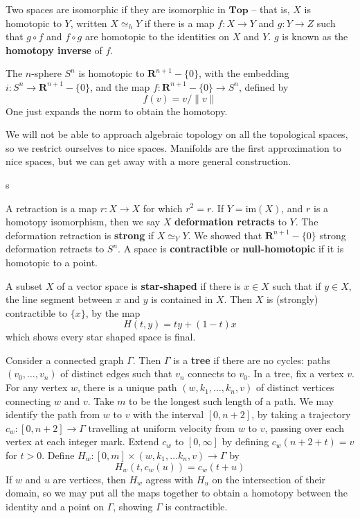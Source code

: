Two spaces are isomorphic if they are isomorphic in $\textbf{Top}$ -- that is, $X$ is homotopic to $Y$, written $X \simeq_h Y$ if there is a map $f:X \to Y$ and $g: Y \to Z$ such that $g \circ f$ and $f \circ g$ are homotopic to the identities on $X$ and $Y$. $g$ is known as the {\bf homotopy inverse} of $f$.

\begin{example}
    The $n$-sphere $S^n$ is homotopic to $\mathbf{R}^{n+1} - \{ 0 \}$, with the embedding $i: S^n \to \mathbf{R}^{n+1} - \{ 0 \}$, and the map $f: \mathbf{R}^{n+1} - \{ 0 \} \to S^n$, defined by
    \[ f(v) = v/\|v\| \]
    One just expands the norm to obtain the homotopy.
\end{example}

We will not be able to approach algebraic topology on all the topological spaces, so we restrict ourselves to nice spaces. Manifolds are the first approximation to nice spaces, but we can get away with a more general construction.

\begin{definition}
    s
\end{definition}

A retraction is a map $r:X \to X$ for which $r^2 = r$. If $Y = \text{im}(X)$, and $r$ is a homotopy isomorphism, then we say $X$ {\bf deformation retracts} to $Y$. The deformation retraction is {\bf strong} if $X \simeq_Y Y$. We showed that $\mathbf{R}^{n+1} - \{ 0 \}$ strong deformation retracts to $S^n$. A space is {\bf contractible} or {\bf null-homotopic} if it is homotopic to a point.

\begin{example}
    A subset $X$ of a vector space is {\bf star-shaped} if there is $x \in X$ such that if $y \in X$, the line segment between $x$ and $y$ is contained in $X$. Then $X$ is (strongly) contractible to $\{ x \}$, by the map
    \[ H(t,y) = ty + (1 - t)x \]
    which shows every star shaped space is final.
\end{example}

\begin{example}
    Consider a connected graph $\Gamma$. Then $\Gamma$ is a {\bf tree} if there are no cycles: paths $(v_0, \dots, v_n)$ of distinct edges such that $v_n$ connects to $v_0$. In a tree, fix a vertex $v$. For any vertex $w$, there is a unique path $(w, k_1, \dots, k_n, v)$ of distinct vertices connecting $w$ and $v$. Take $m$ to be the longest such length of a path. We may identify the path from $w$ to $v$ with the interval $[0,n+2]$, by taking a trajectory $c_w:[0,n+2] \to \Gamma$ travelling at uniform velocity from $w$ to $v$, passing over each vertex at each integer mark. Extend $c_w$ to $[0,\infty]$ by defining $c_w(n+2+t) = v$ for $t > 0$. Define $H_w: [0,m] \times (w, k_1, \dots k_n, v) \to \Gamma$ by
    \[ H_w(t, c_w(u)) = c_w(t + u) \]
    If $w$ and $u$ are vertices, then $H_w$ agress with $H_u$ on the intersection of their domain, so we may put all the maps together to obtain a homotopy between the identity and a point on $\Gamma$, showing $\Gamma$ is contractible.
\end{example}


